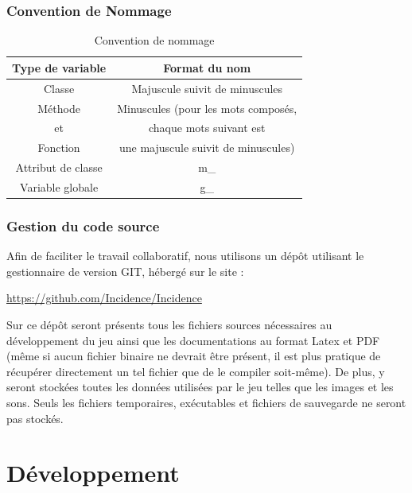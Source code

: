 \documentclass[a4paper]{memoir}
\begin{document}
			\subsection{Convention de Nommage}
				\begin{table}[H]
					\begin{small}
						\begin{tabular}{| c | c |}
							\hline
							\textbf{Type de variable} & \textbf{Format du nom}\\
							\hline
							Classe & Majuscule suivit de minuscules\\
							\hline
							Méthode & Minuscules (pour les mots composés,\\
							et & chaque mots suivant est\\
							Fonction & une majuscule suivit de minuscules)\\
							\hline
							Attribut de classe & m\_\\
							\hline
							Variable globale & g\_\\
							\hline
						\end{tabular}
					\end{small}
					\label{tab:nommage}
					\caption{Convention de nommage}
				\end{table}

			\subsection{Gestion du code source}
				Afin de faciliter le travail collaboratif, nous utilisons un dépôt utilisant le gestionnaire de version GIT, hébergé sur le site :
				\begin{center}
					\url{https://github.com/Incidence/Incidence}
				\end{center}
				Sur ce dépôt seront présents tous les fichiers sources nécessaires au développement du jeu ainsi que les documentations au format Latex et PDF (même si aucun fichier binaire ne devrait être présent, il est plus pratique de récupérer directement un tel fichier que de le compiler soit-même). De plus, y seront stockées toutes les données utilisées par le jeu telles que les images et les sons. Seuls les fichiers temporaires, exécutables et fichiers de sauvegarde ne seront pas stockés.


	\chapter{Développement}
		
\end{document}
